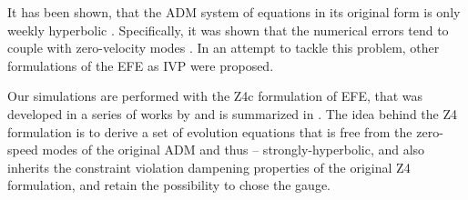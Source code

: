 It has been shown, that the \ac{ADM} system of equations in its original form 
is only weekly hyperbolic \citep{Baumgarte:2002jm}. Specifically, it was shown that 
the numerical errors tend to couple with zero-velocity modes \citep{Alcubierre:1999rt}. 
In an attempt to tackle this problem, other formulations of the \ac{EFE} as \ac{IVP} 
were proposed. 



Our simulations are performed with the Z4c formulation of \ac{EFE}, 
that was developed in a series of works by 
\citet{Bernuzzi:2009ex,Ruiz:2010qj,Weyhausen:2011cg,Cao:2011fu,Hilditch:2012fp} 
and is summarized in \citet{Hilditch:2012fp}. 
%
The idea behind the Z4 formulation is to derive a set of evolution equations that is 
free from the zero-speed modes of the original \ac{ADM} and thus -- 
strongly-hyperbolic, and also inherits the constraint violation dampening properties 
of the original Z4 formulation, and retain the possibility to chose the gauge.

